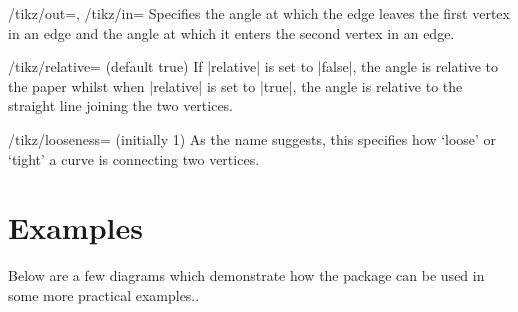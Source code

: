\documentclass[a4paper,final]{ltxdoc}
\begin{document}
\begin{keylist}{%
  /tikz/out=,
  /tikz/in=}
  Specifies the angle at which the edge leaves the first vertex in an edge and the angle at which it enters the second vertex in an edge.
\end{keylist}

\begin{key}{/tikz/relative= (default true)}
  If |relative| is set to |false|, the angle is relative to the paper whilst when |relative| is set to |true|, the angle is relative to the straight line joining the two vertices.
\end{key}

\begin{key}{/tikz/looseness= (initially 1)}
  As the name suggests, this specifies how `loose' or `tight' a curve is connecting two vertices.
\end{key}

\clearpage
\section{Examples}
\label{sec:examples}

Below are a few diagrams which demonstrate how the package can be used in some more practical examples..
\end{document}
